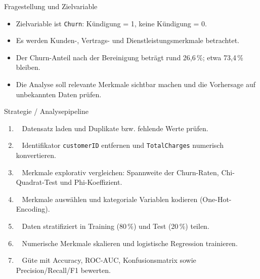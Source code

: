 \documentclass[aspectratio=169,11pt]{beamer}
\begin{document}
\begin{frame}{Fragestellung und Zielvariable}
  \begin{itemize}
    \item<1-> Zielvariable ist \texttt{Churn}: Kündigung = 1, keine Kündigung = 0.\\[0.3cm]
    \item<2-> Es werden Kunden-, Vertrags- und Dienstleistungsmerkmale betrachtet.\\[0.3cm]
    \item<3-> Der Churn-Anteil nach der Bereinigung beträgt rund 26{,}6\,\%; etwa 73{,}4\,\% bleiben.\\[0.3cm]
    \item<4-> Die Analyse soll relevante Merkmale sichtbar machen und die Vorhersage auf unbekannten Daten prüfen.
  \end{itemize}
\end{frame}
\begin{frame}{Strategie / Analysepipeline}
  \begin{enumerate}
    \item<1->~ { Datensatz laden und Duplikate bzw. fehlende Werte prüfen.}\\[0.05cm]
    \item<3->~ { Identifikator \texttt{customerID} entfernen und \texttt{TotalCharges} numerisch konvertieren.}\\[0.05cm]
    \item<5->~ { Merkmale explorativ vergleichen: Spannweite der Churn-Raten, Chi-Quadrat-Test und Phi-Koeffizient.}\\[0.05cm]
    \item<7->~ { Merkmale auswählen und kategoriale Variablen kodieren (One-Hot-Encoding).}\\[0.05cm]
    \item<9->~ { Daten stratifiziert in Training (80\,\%) und Test (20\,\%) teilen.}\\[0.05cm]
    \item<11->~ { Numerische Merkmale skalieren und logistische Regression trainieren.}\\[0.05cm]
    \item<13->~ { Güte mit Accuracy, ROC-AUC, Konfusionsmatrix sowie Precision/Recall/F1 bewerten.}
  \end{enumerate}
\end{frame}
\end{document}
